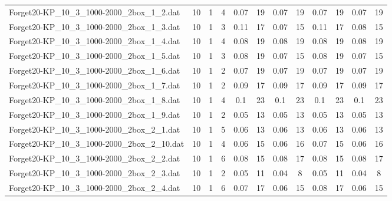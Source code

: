 \begin{sidewaystable}[!ht]
{\begin{tabular}{lccccccccccc}
Forget20-KP\_10\_3\_1000-2000\_2box\_1\_2.dat & 10 & 1 & 4 &  \textcolor{blue2}{0.07} & 19 &  \textcolor{blue2}{0.07} & 19 &  \textcolor{blue2}{0.07} & 19 &  \textcolor{blue2}{0.07} & 19 \\
Forget20-KP\_10\_3\_1000-2000\_2box\_1\_3.dat & 10 & 1 & 3 & 0.11 & 17 &  \textcolor{blue2}{0.07} & 15 & 0.11 & 17 & 0.08 & 15 \\
Forget20-KP\_10\_3\_1000-2000\_2box\_1\_4.dat & 10 & 1 & 4 &  \textcolor{blue2}{0.08} & 19 &  \textcolor{blue2}{0.08} & 19 &  \textcolor{blue2}{0.08} & 19 &  \textcolor{blue2}{0.08} & 19 \\
Forget20-KP\_10\_3\_1000-2000\_2box\_1\_5.dat & 10 & 1 & 3 & 0.08 & 19 &  \textcolor{blue2}{0.07} & 15 & 0.08 & 19 &  \textcolor{blue2}{0.07} & 15 \\
Forget20-KP\_10\_3\_1000-2000\_2box\_1\_6.dat & 10 & 1 & 2 &  \textcolor{blue2}{0.07} & 19 &  \textcolor{blue2}{0.07} & 19 &  \textcolor{blue2}{0.07} & 19 &  \textcolor{blue2}{0.07} & 19 \\
Forget20-KP\_10\_3\_1000-2000\_2box\_1\_7.dat & 10 & 1 & 2 &  \textcolor{blue2}{0.09} & 17 &  \textcolor{blue2}{0.09} & 17 &  \textcolor{blue2}{0.09} & 17 &  \textcolor{blue2}{0.09} & 17 \\
Forget20-KP\_10\_3\_1000-2000\_2box\_1\_8.dat & 10 & 1 & 4 &  \textcolor{blue2}{0.1} & 23 &  \textcolor{blue2}{0.1} & 23 &  \textcolor{blue2}{0.1} & 23 &  \textcolor{blue2}{0.1} & 23 \\
Forget20-KP\_10\_3\_1000-2000\_2box\_1\_9.dat & 10 & 1 & 2 &  \textcolor{blue2}{0.05} & 13 &  \textcolor{blue2}{0.05} & 13 &  \textcolor{blue2}{0.05} & 13 &  \textcolor{blue2}{0.05} & 13 \\
Forget20-KP\_10\_3\_1000-2000\_2box\_2\_1.dat & 10 & 1 & 5 &  \textcolor{blue2}{0.06} & 13 &  \textcolor{blue2}{0.06} & 13 &  \textcolor{blue2}{0.06} & 13 &  \textcolor{blue2}{0.06} & 13 \\
Forget20-KP\_10\_3\_1000-2000\_2box\_2\_10.dat & 10 & 1 & 4 &  \textcolor{blue2}{0.06} & 15 &  \textcolor{blue2}{0.06} & 16 & 0.07 & 15 &  \textcolor{blue2}{0.06} & 16 \\
Forget20-KP\_10\_3\_1000-2000\_2box\_2\_2.dat & 10 & 1 & 6 &  \textcolor{blue2}{0.08} & 15 &  \textcolor{blue2}{0.08} & 17 &  \textcolor{blue2}{0.08} & 15 &  \textcolor{blue2}{0.08} & 17 \\
Forget20-KP\_10\_3\_1000-2000\_2box\_2\_3.dat & 10 & 1 & 2 & 0.05 & 11 &  \textcolor{blue2}{0.04} & 8 & 0.05 & 11 &  \textcolor{blue2}{0.04} & 8 \\
Forget20-KP\_10\_3\_1000-2000\_2box\_2\_4.dat & 10 & 1 & 6 & 0.07 & 17 &  \textcolor{blue2}{0.06} & 15 & 0.08 & 17 &  \textcolor{blue2}{0.06} & 15 \\

\end{tabular}}
\end{sidewaystable}
